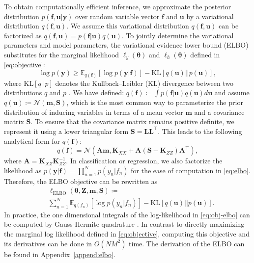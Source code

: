 \documentclass[journal]{IEEEtran}
\begin{document}
To obtain computationally efficient inference, we approximate the posterior distribution $p(\mathbf{f}, \mathbf{u}|\mathbf{y})$ over random variable vector $\mathbf{f}$ and $\mathbf{u}$ by a variational distribution $q(\mathbf{f}, \mathbf{u})$. 
We assume this variational distribution $q(\mathbf{f}, \mathbf{u})$ can be factorized as
$
    q(\mathbf{f}, \mathbf{u}) 
    = p(\mathbf{f} | \mathbf{u}) q(\mathbf{u})
$.
To jointly determine the variational parameters and model parameters, the variational evidence lower bound (ELBO) substitutes for the marginal likelihood $\ell_y(\boldsymbol{\theta})$ and $\ell_h(\boldsymbol{\theta})$ defined in \eqref{eq:objective}:
\begin{equation}
    \log p(\mathbf{y}) \ge \mathbb{E}_{q(\mathbf{f})}\left [ \log p(\mathbf{y}|\mathbf{f}) \right ] - \text{KL}\left [ q(\mathbf{u}) || p(\mathbf{u}) \right ],
    \label{eq:elbo}
\end{equation}
where $\text{KL}[q||p]$ denotes the Kullback–Leibler (KL) divergence between two distributions $q$ and $p$ \cite{kullback1951information}. We have defined: $q(\mathbf{f}) \coloneqq \int p(\mathbf{f}|\mathbf{u}) q(\mathbf{u}) d\mathbf{u}$ and assume $q(\mathbf{u}) \coloneqq \mathcal{N}(\mathbf{m}, \mathbf{S})$, which is the most common way to parameterize the prior distribution of inducing variables in terms of a mean vector $\mathbf{m}$ and a covariance matrix $\mathbf{S}$. To ensure that the covariance matrix remains positive definite, we represent it
using a lower triangular form $\mathbf{S} = \mathbf{L} \mathbf{L}^\top$. 
This leads to the following analytical form for $q(\mathbf{f})$:
\[
    q(\mathbf{f}) = \mathcal{N}(\mathbf{A}\mathbf{m}, \mathbf{K}_{XX} + \mathbf{A} (\mathbf{S} - \mathbf{K}_{ZZ}) \mathbf{A}^\top),
\]
where $\mathbf{A} = \mathbf{K}_{XZ} \mathbf{K}_{ZZ}^{-1}$. 
In classification or regression, we also factorize the likelihood as $p(\mathbf{y}|\mathbf{f}) = \prod_{n=1}^N p(y_n|f_n)$ for the ease of computation in \eqref{eq:elbo}. 
Therefore, the ELBO objective can be rewritten as
\begin{equation}
\begin{aligned}
    &~\ell_\text{ELBO}(\boldsymbol{\theta}, \mathbf{Z}, \mathbf{m}, \mathbf{S}) \coloneqq \\
    &~\sum_{n=1}^N \mathbb{E}_{q(f_n)}\left [ \log p(y_n|f_n) \right ] - \text{KL}\left [ q(\mathbf{u}) || p(\mathbf{u}) \right ].
    \label{eq:obj-elbo}
\end{aligned}
\end{equation}
In practice, the one dimensional integrals of the log-likelihood in \eqref{eq:obj-elbo} can
be computed by Gauss-Hermite quadrature \cite{liu1994note}.
In contrast to directly maximizing the marginal log likelihood defined in \eqref{eq:objective}, computing this objective and its derivatives can be done in $O(NM^2)$ time. The derivation of the ELBO can be found in Appendix~\ref{append:elbo}.
\end{document}
